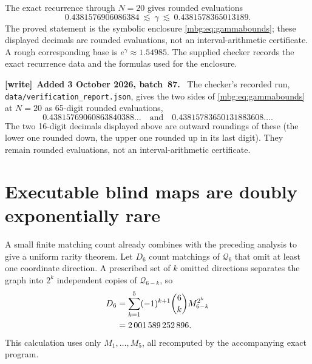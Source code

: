 \documentclass[11pt,letterpaper]{article}
\theoremstyle{definition}
\newenvironment{writenote}[1][]{\par\smallskip\begingroup\small
 \noindent\textbf{[write]}\if\relax\detokenize{#1}\relax\else~\textbf{#1.}\fi\ }%
 {\par\endgroup\smallskip}
\begin{document}
The exact recurrence through $N=20$ gives rounded evaluations
\[
 0.4381576906086384\ \lesssim\ \gamma\ \lesssim\ 0.4381578365013189.
\]
The proved statement is the symbolic enclosure \eqref{mbg:eq:gammabounds}; these displayed decimals are rounded evaluations, not an interval-arithmetic certificate. A rough corresponding base is $e^\gamma\approx1.54985$. The supplied checker records the exact recurrence data and the formulas used for the enclosure.

\begin{writenote}[Added 3 October 2026, batch~87]
The checker's recorded run, \texttt{data/\allowbreak verification\_\allowbreak report.json}, gives the two sides of \eqref{mbg:eq:gammabounds} at $N=20$ as 65-digit rounded evaluations,
\[
 0.43815769060863840388\ldots\quad\text{and}\quad0.43815783650131883608\ldots.
\]
The two 16-digit decimals displayed above are outward roundings of these (the lower one rounded down, the upper one rounded up in its last digit). They remain rounded evaluations, not an interval-arithmetic certificate.
\end{writenote}

\section{Executable blind maps are doubly exponentially rare}
\label{mbg:sec:rarity}

A small finite matching count already combines with the preceding analysis to give a uniform rarity theorem. Let $D_6$ count matchings of $\mathcal Q_6$ that omit at least one coordinate direction. A prescribed set of $k$ omitted directions separates the graph into $2^k$ independent copies of $\mathcal Q_{6-k}$, so
\begin{align}
 D_6
 &=\sum_{k=1}^{5}(-1)^{k+1}\binom6k M_{6-k}^{2^k}\notag\\
 &=2\,001\,589\,252\,896.
 \label{mbg:eq:D6}
\end{align}
This calculation uses only $M_1,\ldots,M_5$, all recomputed by the accompanying exact program.
\end{document}
